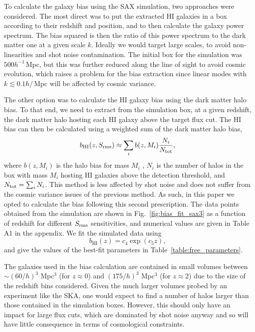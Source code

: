\documentclass[useAMS,usenatbib]{mn2e}
\newcommand{\be}{\begin{equation}}
\newcommand{\ee}{\end{equation}}
\begin{document}
To calculate the galaxy bias using the SAX simulation, two approaches were considered. The most direct was to put the extracted HI galaxies in a box according to their redshift and position, and to then calculate the galaxy power spectrum. The bias squared is then the ratio of this power spectrum to the dark matter one at a given scale $k$. Ideally we would target large scales, to avoid non-linearities and shot noise contamination.
The initial box for the simulation was $500h^{-1}\,$Mpc, but this was further reduced along the line of sight to avoid cosmic evolution, which raises a problem for the bias extraction since linear modes with $k\lesssim 0.1 h/\,$Mpc will be affected by cosmic variance.

The other option was to calculate the HI galaxy bias using the dark matter halo bias. To that end, we need to extract from the simulation box, at a given redshift, the dark matter halo hosting each HI galaxy above the target flux cut. The HI bias can then be calculated using a weighted sum of the dark matter halo bias,
\be
b_\mathrm{HI}(z,S_{\rm rms}) \approx \sum_i b(z, M_i)\frac{N_i}{N_{\rm tot}},
\ee
where $b(z, M_i)$ is the halo bias for mass $M_i$ \citep{1999MNRAS.308..119S}, $N_i$ is the number of halos in the box with mass $M_i$ hosting HI galaxies above the detection threshold, and $N_{\rm tot}=\sum_i N_i$. This method is less affected by shot noise and does not suffer from the cosmic variance issues of the previous method. As such, in this paper we opted to calculate the bias following this second prescription.
The data points obtained from the simulation are shown in Fig.~\ref{fig:bias_fit_sax3} as a function of redshift for different $S_{\rm{rms}}$ sensitivities, and numerical values are given in Table A1 in the appendix. We fit the simulated data using
\be \label{bias}
b_\mathrm{HI}(z) = c_4 \exp({c_5z}),
\ee
and give the values of the best-fit parameters in Table~\ref{table:free_parameters}.

The galaxies used in the bias calculation are contained in small volumes between $\sim (60 / h)^3$ Mpc$^3$ (for $z\approx 0$) and $(175 / h)^3$ Mpc$^3$ (for $z \approx 2$) due to the size of the redshift bins considered. Given the much larger volumes probed by an experiment like the SKA, one would expect to find a number of halos larger than those contained in the simulation boxes. However, this should only have an impact for large flux cuts, which are dominated by shot noise anyway and so will have little consequence in terms of cosmological constraints.
\end{document}
